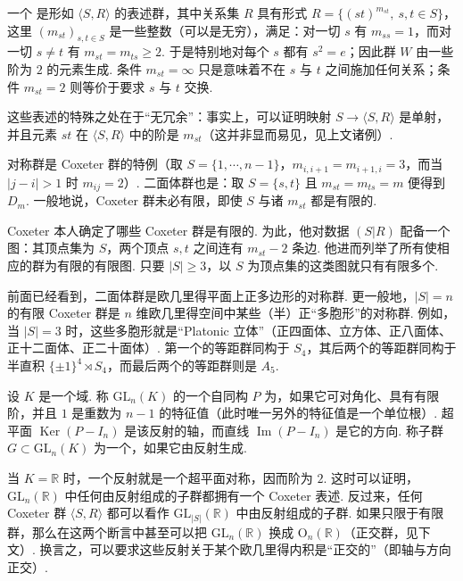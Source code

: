 \begin{numpara}[Coxeter 群]\label{np:fg-2-3-7}
一个 是形如 $\langle S,R\rangle$ 的表述群，其中关系集 $R$ 具有形式 $R=\{(st)^{m_{st}},\ s,t\in S\}$，这里 $(m_{st})_{s,t\in S}$ 是一些整数（可以是无穷），满足：对一切 $s$ 有 $m_{ss}=1$，而对一切 $s\neq t$ 有 $m_{st}=m_{ts}\geqslant 2$. 于是特别地对每个 $s$ 都有 $s^2=e$；因此群 $W$ 由一些阶为 $2$ 的元素生成. 条件 $m_{st}=\infty$ 只是意味着不在 $s$ 与 $t$ 之间施加任何关系；条件 $m_{st}=2$ 则等价于要求 $s$ 与 $t$ 交换.

这些表述的特殊之处在于``无冗余''：事实上，可以证明映射 $S\longrightarrow\langle S,R\rangle$ 是单射，并且元素 $st$ 在 $\langle S,R\rangle$ 中的阶是 $m_{st}$（这并非显而易见，见上文诸例）.

对称群是 Coxeter 群的特例（取 $S=\{1,\cdots,n-1\}$，$m_{i,i+1}=m_{i+1,i}=3$，而当 $|j-i|>1$ 时 $m_{ij}=2$）. 二面体群也是：取 $S=\{s,t\}$ 且 $m_{st}=m_{ts}=m$ 便得到 $D_m$. 一般地说，Coxeter 群未必有限，即使 $S$ 与诸 $m_{st}$ 都是有限的.

Coxeter 本人确定了哪些 Coxeter 群是有限的. 为此，他对数据 $(S|R)$ 配备一个图：其顶点集为 $S$，两个顶点 $s,t$ 之间连有 $m_{st}-2$ 条边. 他进而列举了所有使相应的群为有限的有限图. 只要 $|S|\geqslant 3$，以 $S$ 为顶点集的这类图就只有有限多个.

前面已经看到，二面体群是欧几里得平面上正多边形的对称群. 更一般地，$|S|=n$ 的有限 Coxeter 群是 $n$ 维欧几里得空间中某些（半）正``多胞形''的对称群. 例如，当 $|S|=3$ 时，这些多胞形就是``Platonic 立体''（正四面体、立方体、正八面体、正十二面体、正二十面体）. 第一个的等距群同构于 $S_4$，其后两个的等距群同构于半直积 $\{\pm1\}^4\rtimes S_4$，而最后两个的等距群则是 $A_5$.
\end{numpara}
\begin{numpara}[反射群]\label{np:fg-2-3-8}
设 $K$ 是一个域. 称 $\mathrm{GL}_n(K)$ 的一个自同构 $P$ 为，如果它可对角化、具有有限阶，并且 $1$ 是重数为 $n-1$ 的特征值（此时唯一另外的特征值是一个单位根）. 超平面 $\operatorname{Ker}(P-I_n)$ 是该反射的轴，而直线 $\operatorname{Im}(P-I_n)$ 是它的方向. 称子群 $G\subset\mathrm{GL}_n(K)$ 为一个，如果它由反射生成.

当 $K=\mathbb{R}$ 时，一个反射就是一个超平面对称，因而阶为 $2$. 这时可以证明，$\mathrm{GL}_n(\mathbb{R})$ 中任何由反射组成的子群都拥有一个 Coxeter 表述. 反过来，任何 Coxeter 群 $\langle S,R\rangle$ 都可以看作 $\mathrm{GL}_{|S|}(\mathbb{R})$ 中由反射组成的子群. 如果只限于有限群，那么在这两个断言中甚至可以把 $\mathrm{GL}_n(\mathbb{R})$ 换成 $\mathrm{O}_n(\mathbb{R})$（正交群，见下文）. 换言之，可以要求这些反射关于某个欧几里得内积是``正交的''（即轴与方向正交）.
\end{numpara}

